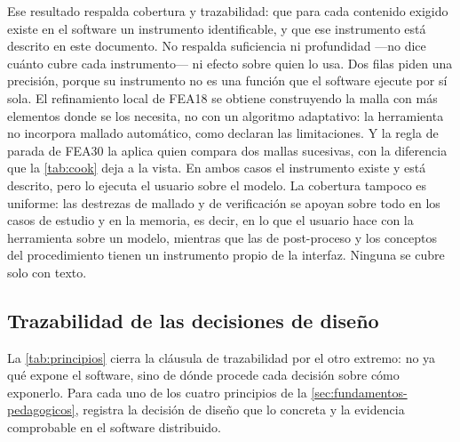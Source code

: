 Ese resultado respalda cobertura y trazabilidad: que para cada contenido exigido existe en el software un instrumento identificable, y que ese instrumento está descrito en este documento. No respalda suficiencia ni profundidad —no dice cuánto cubre cada instrumento— ni efecto sobre quien lo usa. Dos filas piden una precisión, porque su instrumento no es una función que el software ejecute por sí sola. El refinamiento local de FEA18 se obtiene construyendo la malla con más elementos donde se los necesita, no con un algoritmo adaptativo: la herramienta no incorpora mallado automático, como declaran las limitaciones. Y la regla de parada de FEA30 la aplica quien compara dos mallas sucesivas, con la diferencia que la \autoref{tab:cook} deja a la vista. En ambos casos el instrumento existe y está descrito, pero lo ejecuta el usuario sobre el modelo. La cobertura tampoco es uniforme: las destrezas de mallado y de verificación se apoyan sobre todo en los casos de estudio y en la memoria, es decir, en lo que el usuario hace con la herramienta sobre un modelo, mientras que las de post-proceso y los conceptos del procedimiento tienen un instrumento propio de la interfaz. Ninguna se cubre solo con texto.

\subsection{Trazabilidad de las decisiones de diseño}
\label{sec:trazabilidad-diseno}

La \autoref{tab:principios} cierra la cláusula de trazabilidad por el otro extremo: no ya qué expone el software, sino de dónde procede cada decisión sobre cómo exponerlo. Para cada uno de los cuatro principios de la \autoref{sec:fundamentos-pedagogicos}, registra la decisión de diseño que lo concreta y la evidencia comprobable en el software distribuido.

